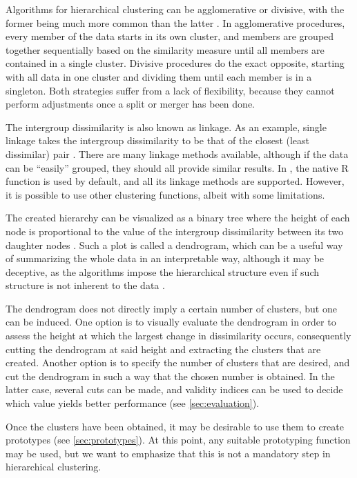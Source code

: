 Algorithms for hierarchical clustering can be agglomerative or divisive,
with the former being much more common than the latter \citep{hastie2009}.
In agglomerative procedures,
every member of the data starts in its own cluster,
and members are grouped together sequentially based on the similarity measure until all members are contained in a single cluster.
Divisive procedures do the exact opposite,
starting with all data in one cluster and dividing them until each member is in a singleton.
Both strategies suffer from a lack of flexibility,
because they cannot perform adjustments once a split or merger has been done.

The intergroup dissimilarity is also known as linkage.
As an example, single linkage takes the intergroup dissimilarity to be that of the closest (least dissimilar) pair \citep{hastie2009}.
There are many linkage methods available,
although if the data can be ``easily'' grouped,
they should all provide similar results.
In \dtwclust{}, the native R function  is used by default,
and all its linkage methods are supported.
However, it is possible to use other clustering functions,
albeit with some limitations.

The created hierarchy can be visualized as a binary tree where the height of each node is proportional to the value of the intergroup dissimilarity between its two daughter nodes \citep{hastie2009}.
Such a plot is called a dendrogram,
which can be a useful way of summarizing the whole data in an interpretable way,
although it may be deceptive,
as the algorithms impose the hierarchical structure even if such structure is not inherent to the data \citep{hastie2009}.

The dendrogram does not directly imply a certain number of clusters, but one can be induced.
One option is to visually evaluate the dendrogram in order to assess the height at which the largest change in dissimilarity occurs,
consequently cutting the dendrogram at said height and extracting the clusters that are created.
Another option is to specify the number of clusters that are desired,
and cut the dendrogram in such a way that the chosen number is obtained.
In the latter case,
several cuts can be made,
and validity indices can be used to decide which value yields better performance (see \cref{sec:evaluation}).

Once the clusters have been obtained,
it may be desirable to use them to create prototypes (see \cref{sec:prototypes}).
At this point, any suitable prototyping function may be used,
but we want to emphasize that this is not a mandatory step in hierarchical clustering.

